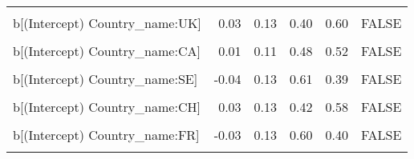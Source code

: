 \begin{table}
\begin{tabular}[t]{lrrrrl}
\cellcolor{gray!10}{b[EPS Country\_name:NL]} & \cellcolor{gray!10}{0.07} & \cellcolor{gray!10}{0.05} & \cellcolor{gray!10}{0.09} & \cellcolor{gray!10}{0.91} & \cellcolor{gray!10}{FALSE}\\
b[(Intercept) Country\_name:UK] & 0.03 & 0.13 & 0.40 & 0.60 & FALSE\\
\cellcolor{gray!10}{b[EPS Country\_name:UK]} & \cellcolor{gray!10}{0.04} & \cellcolor{gray!10}{0.05} & \cellcolor{gray!10}{0.19} & \cellcolor{gray!10}{0.81} & \cellcolor{gray!10}{FALSE}\\
b[(Intercept) Country\_name:CA] & 0.01 & 0.11 & 0.48 & 0.52 & FALSE\\
\cellcolor{gray!10}{b[EPS Country\_name:CA]} & \cellcolor{gray!10}{0.01} & \cellcolor{gray!10}{0.05} & \cellcolor{gray!10}{0.41} & \cellcolor{gray!10}{0.59} & \cellcolor{gray!10}{FALSE}\\
b[(Intercept) Country\_name:SE] & -0.04 & 0.13 & 0.61 & 0.39 & FALSE\\
\cellcolor{gray!10}{b[EPS Country\_name:SE]} & \cellcolor{gray!10}{-0.06} & \cellcolor{gray!10}{0.05} & \cellcolor{gray!10}{0.89} & \cellcolor{gray!10}{0.11} & \cellcolor{gray!10}{FALSE}\\
b[(Intercept) Country\_name:CH] & 0.03 & 0.13 & 0.42 & 0.58 & FALSE\\
\cellcolor{gray!10}{b[EPS Country\_name:CH]} & \cellcolor{gray!10}{0.04} & \cellcolor{gray!10}{0.05} & \cellcolor{gray!10}{0.17} & \cellcolor{gray!10}{0.83} & \cellcolor{gray!10}{FALSE}\\
b[(Intercept) Country\_name:FR] & -0.03 & 0.13 & 0.60 & 0.40 & FALSE\\
\cellcolor{gray!10}{b[EPS Country\_name:FR]} & \cellcolor{gray!10}{-0.06} & \cellcolor{gray!10}{0.05} & \cellcolor{gray!10}{0.89} & \cellcolor{gray!10}{0.11} & \cellcolor{gray!10}{FALSE}\\
\bottomrule
\end{tabular}
\end{table}
